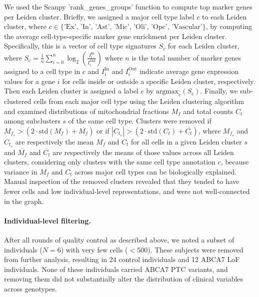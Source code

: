 \documentclass[12pt]{article}
\begin{document}
We used the Scanpy 'rank\_genes\_groups' function to compute top marker genes per Leiden cluster. Briefly, we assigned a major cell type label $ c $ to each Leiden cluster, where $ c \in \{\text{'Ex', 'In', 'Ast', 'Mic', 'Oli', 'Opc', 'Vascular'}\} $, by computing the average cell-type-specific marker gene enrichment per Leiden cluster. Specifically, this is a vector of cell type signatures $ S_c $ for each Leiden cluster, where 
$ S_c = \frac{1}{n} \sum_{i=0}^{n} \log_2\left(\frac{I_i^{\text{In}}}{I_i^{\text{Out}}}\right) $
where $ n $ is the total number of marker genes assigned to a cell type in $ c $ and $ I_i^{\text{In}} $ and $ I_i^{\text{Out}} $ indicate average gene expression values for a gene $ i $ for cells inside or outside a specific Leiden cluster, respectively. Then each Leiden cluster is assigned a label $ c $ by 
$ \text{argmax}_c(S_c) $.
Finally, we sub-clustered cells from each major cell type using the Leiden clustering algorithm and examined distributions of mitochondrial fractions $ M_f $ and total counts $ C_t $ among subclusters $ s $ of the same cell type. Clusters were removed if 
$ M_{f_s} > (2 \cdot \text{std}(M_f) + \overline{M_f}) $ 
or if 
$ |C_{t_s}| > (2 \cdot \text{std}(C_t) + \overline{C_t}) $, 
where $ M_{f_s} $ and $ C_{t_s} $ are respectively the mean $ M_f $ and $ C_t $ for all cells in a given Leiden cluster $ s $ and $ \overline{M_f} $ and $ \overline{C_t} $ are respectively the means of those values across all Leiden clusters, considering only clusters with the same cell type annotation $ c $, because variance in $ M_f $ and $ C_t $ across major cell types can be biologically explained. Manual inspection of the removed clusters revealed that they tended to have fewer cells and low individual-level representations, and were not well-connected in the graph.

\paragraph{Individual-level filtering.}
After all rounds of quality control as described above, we noted a subset of individuals ($N=6$) with very few cells ($<500$). These subjects were removed from further analysis, resulting in 24 control individuals and 12 ABCA7 LoF individuals. None of these individuals carried ABCA7 PTC variants, and removing them did not substantially alter the distribution of clinical variables across genotypes.
\end{document}
